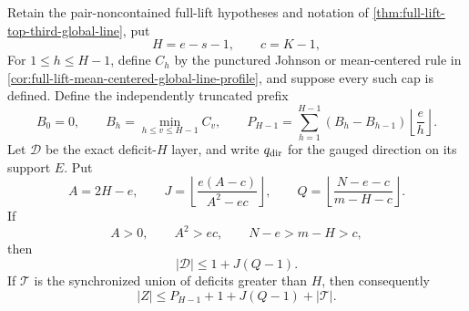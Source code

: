 \documentclass[11pt,a4paper]{amsart}
\numberwithin{equation}{section}
\theoremstyle{remark}
\begin{document}
\begin{corollary}
\label{cor:full-lift-boundary-direction-router}
Retain the pair-noncontained full-lift hypotheses and notation of
\cref{thm:full-lift-top-third-global-line}, put
\[
 H=e-s-1,\qquad c=K-1,
\]
For $1\le h\le H-1$, define $C_h$ by the punctured Johnson or
mean-centered rule in
\cref{cor:full-lift-mean-centered-global-line-profile}, and suppose every
such cap is defined.  Define the independently truncated prefix
\[
 B_0=0,\qquad B_h=\min_{h\le v\le H-1}C_v,
 \qquad
 P_{H-1}=\sum_{h=1}^{H-1}(B_h-B_{h-1})
                 \left\lfloor\frac eh\right\rfloor.
\]
Let $\mathcal D$ be the exact deficit-$H$ layer, and write $q_{\rm dir}$
for the gauged direction on its support $E$.  Put
\[
 A=2H-e,
 \qquad
 J=\left\lfloor\frac{e(A-c)}{A^2-ec}\right\rfloor,
 \qquad
 Q=\left\lfloor\frac{N-e-c}{m-H-c}\right\rfloor.
\]
If
\[
 A>0,\qquad A^2>ec,\qquad N-e>m-H>c,
\]
then
\begin{equation}
 |\mathcal D|\le 1+J(Q-1).
 \label{eq:full-lift-boundary-direction-cap}
\end{equation}
If $\mathcal T$ is the synchronized union of deficits greater than $H$,
then consequently
\begin{equation}
 |Z|\le P_{H-1}+1+J(Q-1)+|\mathcal T|.
 \label{eq:full-lift-boundary-direction-router}
\end{equation}
\end{corollary}
\end{document}

